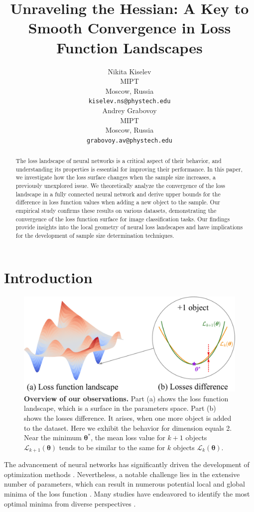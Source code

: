 \documentclass{article}
\title{Unraveling the Hessian: A Key to Smooth Convergence in Loss Function Landscapes}
\author{%
  Nikita Kiselev\\
  MIPT\\
  Moscow, Russia\\
  \texttt{kiselev.ns@phystech.edu}\\
  \And
  Andrey Grabovoy\\
  MIPT\\
  Moscow, Russia\\
  \texttt{grabovoy.av@phystech.edu}\\
}
\begin{document}
\maketitle

\begin{abstract}
    The loss landscape of neural networks is a critical aspect of their behavior, and understanding its properties is essential for improving their performance. In this paper, we investigate how the loss surface changes when the sample size increases, a previously unexplored issue. We theoretically analyze the convergence of the loss landscape in a fully connected neural network and derive upper bounds for the difference in loss function values when adding a new object to the sample. Our empirical study confirms these results on various datasets, demonstrating the convergence of the loss function surface for image classification tasks. Our findings provide insights into the local geometry of neural loss landscapes and have implications for the development of sample size determination techniques.
\end{abstract}

\section{Introduction}\label{sec:intro}

\begin{figure}[ht]
    \centering
    \includegraphics[width=0.65\linewidth]{losses_difference.pdf}
    \caption{\textbf{Overview of our observations.} Part (a) shows the loss function landscape, which is a surface in the parameters space. Part (b) shows the losses difference. It arises, when one more object is added to the dataset. Here we exhibit the behavior for dimension equals 2. Near the minimum $\boldsymbol{\theta}^*$, the mean loss value for $k+1$ objects $\mathcal{L}_{k+1}(\boldsymbol{\theta})$ tends to be similar to the same for $k$ objects $\mathcal{L}_{k}(\boldsymbol{\theta})$.}
    \label{fig:overview}
\end{figure}

The advancement of neural networks has significantly driven the development of optimization methods \cite{choi2020empiricalcomparisonsoptimizersdeep, Soydaner_2020, schmidt2021descendingcrowdedvalley}. Nevertheless, a notable challenge lies in the extensive number of parameters, which can result in numerous potential local and global minima of the loss function \cite{neyshabur2018the, zou2019improvedanalysistrainingoverparameterized, allenzhu2019convergencetheorydeeplearning, allenzhu2020learninggeneralizationoverparameterizedneural}. Many studies have endeavored to identify the most optimal minima from diverse perspectives \cite{choromanska2015losssurfacesmultilayernetworks, you2017largebatchtrainingconvolutional, li2018visualizinglosslandscapeneural}.
\end{document}

